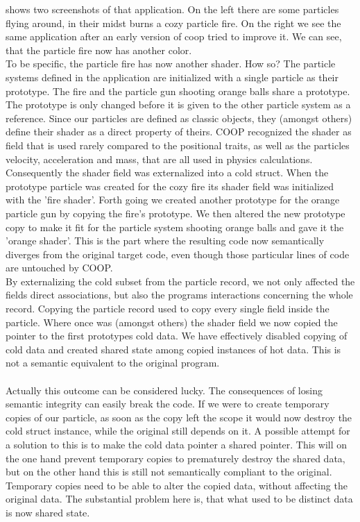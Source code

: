  shows two screenshots of that application. On the left there are some particles flying around, in their midst burns a cozy particle fire. On the right we see the same application after an early version of coop tried to improve it. We can see, that the particle fire now has another color.\\
To be specific, the particle fire has now another shader. How so? The particle systems defined in the application are initialized with a single particle as their prototype. The fire and the particle gun shooting orange balls share a prototype. The prototype is only changed before it is given to the other particle system as a reference. Since our particles are defined as classic objects, they (amongst others) define their shader as a direct property of theirs. COOP recognized the shader as field that is used rarely compared to the positional traits, as well as the particles velocity, acceleration and mass, that are all used in physics calculations. Consequently the shader field was externalized into a cold struct. When the prototype particle was created for the cozy fire its shader field was initialized with the 'fire shader'. Forth going we created another prototype for the orange particle gun by copying the fire's prototype. We then altered the new prototype copy to make it fit for the particle system shooting orange balls and gave it the 'orange shader'. This is the part where the resulting code now semantically diverges from the original target code, even though those particular lines of code are untouched by COOP.\\
By externalizing the cold subset from the particle record, we not only affected the fields direct associations, but also the programs interactions concerning the whole record. Copying the particle record used to copy every single field inside the particle. Where once was (amongst others) the shader field we now copied the pointer to the first prototypes cold data. We have effectively disabled copying of cold data  and created shared state among copied instances of hot data. This is not a semantic equivalent to the original program.\\\\
Actually this outcome can be considered lucky. The consequences of losing semantic integrity can easily break the code. If we were to create temporary copies of our particle, as soon as the copy left the scope it would now destroy the cold struct instance, while the original still depends on it. A possible attempt for a solution to this is to make the cold data pointer a shared pointer. This will on the one hand prevent temporary copies to prematurely destroy the shared data, but on the other hand this is still not semantically compliant to the original. Temporary copies need to be able to alter the copied data, without affecting the original data. The substantial problem here is, that what used to be distinct data is now shared state.\\\\ 
